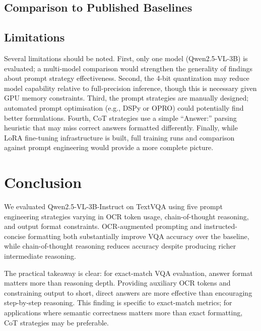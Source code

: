 \documentclass[11pt]{article}
\begin{document}
\subsection{Comparison to Published Baselines}


\subsection{Limitations}

Several limitations should be noted. First, only one model (Qwen2.5-VL-3B) is evaluated; a multi-model comparison would strengthen the generality of findings about prompt strategy effectiveness. Second, the 4-bit quantization may reduce model capability relative to full-precision inference, though this is necessary given GPU memory constraints. Third, the prompt strategies are manually designed; automated prompt optimisation (e.g., DSPy or OPRO) could potentially find better formulations. Fourth, CoT strategies use a simple ``Answer:'' parsing heuristic that may miss correct answers formatted differently. Finally, while LoRA fine-tuning infrastructure is built, full training runs and comparison against prompt engineering would provide a more complete picture.


\section{Conclusion}


We evaluated Qwen2.5-VL-3B-Instruct on TextVQA using five prompt engineering strategies varying in OCR token usage, chain-of-thought reasoning, and output format constraints. OCR-augmented prompting and instructed-concise formatting both substantially improve VQA accuracy over the baseline, while chain-of-thought reasoning reduces accuracy despite producing richer intermediate reasoning.

The practical takeaway is clear: for exact-match VQA evaluation, answer format matters more than reasoning depth. Providing auxiliary OCR tokens and constraining output to short, direct answers are more effective than encouraging step-by-step reasoning. This finding is specific to exact-match metrics; for applications where semantic correctness matters more than exact formatting, CoT strategies may be preferable.
\end{document}
